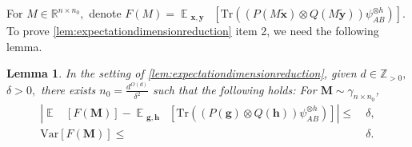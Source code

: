 \documentclass[11pt]{article}
\theoremstyle{plain}
\newtheorem{lemma}[theorem]{Lemma}
\theoremstyle{definition}
\newcommand {\minusspace} {\: \! \!}
\newcommand {\Fn} [2] {\ensuremath{ #1 \minusspace \Br{ #2 } }}
\newcommand{\reals}{{\mathbb R}}
\newcommand {\br} [1] {\ensuremath{ \left( #1 \right) }}
\newcommand {\Br} [1] {\ensuremath{ \left[ #1 \right] }}
\newcommand {\ab} [1] {\ensuremath{ \left| #1 \right| }}
\DeclareMathOperator*{\bigE}{\mathbb{E}}
\newcommand {\expec} [2] {\Fn{\bigE_{\substack{#1}}}{#2}}
\newcommand {\Tr} {\ensuremath{ \mathrm{Tr} }}
\newcommand{\posint}{{\mathbb Z}_{>0}}
\newcommand{\randg}{\ensuremath{\mathbf{g}}}
\newcommand{\randh}{\ensuremath{\mathbf{h}}}
\newcommand{\randx}{\ensuremath{\mathbf{x}}}
\newcommand{\randy}{\ensuremath{\mathbf{y}}}
\newcommand {\var} [1] {\mathrm{Var}\Br{#1}}
\newcommand{\1}{\mathbb{1}} %
\begin{document}
For $M\in\reals^{n\times n_0},$ denote $F(M)=\expec{\mathbf{x},\mathbf{y}}{\Tr\br{\br{P(M\tilde{\randx})\otimes Q(M\tilde{\randy})}\psi_{AB}^{\otimes h}}}$. 
To prove \cref{lem:expectationdimensionreduction} item 2, we need the following lemma.

\begin{lemma}\label{lem:meanvar}
In the setting of \cref{lem:expectationdimensionreduction}, given $d\in\posint,$ $\delta>0,$ there exists $n_0=\frac{d^{O(d)}}{\delta^2}$ such that the following holds: For $\mathbf{M}\sim\gamma_{n\times n_0}$,
\begin{align*}
\ab{\expec{}{F(\mathbf{M})}-\expec{\mathbf{g},\mathbf{h}}{\Tr\br{\br{P(\randg)\otimes Q(\randh)}\psi_{AB}^{\otimes h}}}}\leq~&\delta,\\
\var{F(\mathbf{M})}\leq~&\delta.\\
\end{align*}
\end{lemma}
\end{document}
